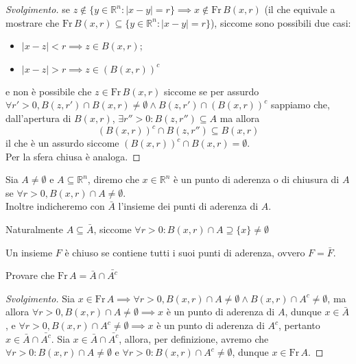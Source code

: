 \begin{proof}[Svolgimento]
	se $z \not\in \{y \in \mathbb{R}^n : |x-y| = r \} \implies x \not\in \text{Fr} \, B(x, r)$ (il che equivale a mostrare che $\text{Fr} \, B(x,r) \subseteq \{y \in \mathbb{R}^n : |x-y| = r \}$), siccome sono possibili due casi:
	\begin{itemize}
		\item $|x-z| < r \implies z \in B(x, r)$;
		\item $|x-z| > r \implies z \in (B(x, r))^c$
	\end{itemize}
	e non è possibile che $z \in \text{Fr} \, B(x, r)$ siccome se per assurdo $\forall r' > 0, B(z, r') \cap B(x, r) \neq \emptyset \wedge B(z, r') \cap (B(x, r))^c$ sappiamo che, dall'apertura di $B(x, r)$, $\exists r'' > 0: B(z, r'') \subseteq A$ ma allora
	$$
	(B(x, r))^c \cap B(z, r'') \subseteq B(x, r)
	$$
	il che è un assurdo siccome $(B(x,r))^c \cap B(x, r) = \emptyset$. \\
	Per la sfera chiusa è analoga.
\end{proof}
\begin{definition}
	Sia $A \neq \emptyset$ e $A \subseteq \mathbb{R}^n$, diremo che $x \in \mathbb{R}^n$ è un punto di aderenza o di chiusura di $A$ se $\forall r > 0, B(x, r) \cap A \neq \emptyset$. \\
	Inoltre indicheremo con $\bar{A}$ l'insieme dei punti di aderenza di $A$.
\end{definition}
\begin{remark}
	Naturalmente $A \subseteq \bar{A}$, siccome $\forall r > 0: B(x, r) \cap A \supseteq \{ x \} \neq \emptyset$
\end{remark}
\begin{definition}
	Un insieme $F$ è chiuso se contiene tutti i suoi punti di aderenza, ovvero $F = \bar{F}$.
\end{definition}
\begin{exercise}
	Provare che $\text{Fr} \, A = \bar{A} \cap \bar{A^c}$
	\label{exercise:frontiera_intersec}
\end{exercise}
\begin{proof}[Svolgimento]
	Sia $x \in \text{Fr} \, A \implies \forall r > 0, B(x, r) \cap A \neq \emptyset \wedge B(x, r) \cap A^c \neq \emptyset$, ma allora $\forall r > 0, B(x, r) \cap A \neq \emptyset \implies x$ è un punto di aderenza di $A$, dunque $x \in \bar{A}$, e $\forall r > 0, B(x, r) \cap A^c \neq \emptyset \implies x$ è un punto
	di aderenza di $A^c$, pertanto $x \in \bar{A} \cap \bar{A^c}$. Sia $x \in \bar{A} \cap \bar{A^c}$, allora, per definizione, avremo che $\forall r > 0: B(x, r) \cap A \neq \emptyset$ e $\forall r > 0: B(x, r) \cap A^c \neq \emptyset$, dunque $x \in \text{Fr} \, A$.
\end{proof}
